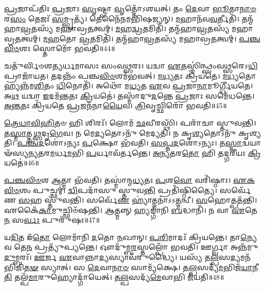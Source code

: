 \-\ul{𑌪𑍍𑌰}\-𑌜𑌾\-𑌪᳴𑌤𑌿𑌃 \ul{𑌪𑍍𑌰}\-𑌜𑌾𑌃 \ul{𑌸𑍃}\-𑌷𑍍𑌟𑍍𑌵𑌾 \ul{𑌵𑍃}\-𑌤𑍍𑌤𑍋᳴\-𑌽𑌶𑌯𑌤𑍍।
𑌤𑌂 \ul{𑌦𑍇}\-𑌵𑌾 \ul{𑌭𑍂}\-𑌤𑌾\-\ul{𑌨𑌾}\-\-\ul{𑍞} 𑌰\-\ul{𑌸𑌂} 𑌤𑍇𑌜𑌃᳴ \ul{𑌸}\-𑌮𑍍𑌭𑍃𑌤𑍍𑌯᳴।
𑌤𑍇𑌨𑍈᳴𑌨𑌮𑌭𑌿𑌷𑌜𑍍𑌯𑌨𑍍।
\-\ul{𑌮}\-𑌹𑌾𑌨᳴𑌵\-\ul{𑌵}\-𑌰𑍍𑌤𑍀𑌤𑌿᳴।
𑌤𑌨𑍍𑌮᳴𑌹𑌾\-\ul{𑌵𑍍𑌰}\-𑌤𑌸𑍍𑌯᳴ 𑌮𑌹𑌾𑌵𑍍𑌰\-\ul{𑌤}\-𑌤𑍍𑌵𑌮𑍍।
\-\ul{𑌮}\-𑌹\-\ul{𑌦𑍍𑌵𑍍𑌰}\-𑌤𑌮𑌿𑌤𑌿᳴।
𑌤𑌨𑍍𑌮᳴𑌹𑌾\-\ul{𑌵𑍍𑌰}\-𑌤𑌸𑍍𑌯᳴ 𑌮𑌹𑌾𑌵𑍍𑌰\-\ul{𑌤}\-𑌤𑍍𑌵𑌮𑍍।
\-\ul{𑌮}\-\-\ul{𑌹}\-𑌤𑍋 \ul{𑌵𑍍𑌰}\-𑌤𑌮𑌿𑌤𑌿᳴।
𑌤𑌨𑍍𑌮᳴𑌹𑌾\-\ul{𑌵𑍍𑌰}\-𑌤𑌸𑍍𑌯᳴ 𑌮𑌹𑌾𑌵𑍍𑌰\-\ul{𑌤}\-𑌤𑍍𑌵𑌮𑍍।
\-\ul{𑌪}\-\-\ul{𑌞𑍍𑌚}\-\-\ul{𑌵𑌿}\-\-\ul{𑍞}\-𑌶𑌃 𑌸𑍍𑌤𑍋𑌮𑍋᳴ 𑌭𑌵𑌤𑌿॥44॥

𑌚𑌤𑍁᳴𑌰𑍍𑌵𑌿𑍞𑌶𑌤𑍍𑌯𑌰𑍍𑌧𑌮𑌾𑌸𑌃 𑌸𑌂𑌵\-\ul{𑌥𑍍𑌸}\-𑌰𑌃।
𑌯𑌦𑍍𑌵𑌾 \ul{𑌏}\-𑌤𑌸𑍍𑌮𑌿॑𑌨𑍍𑌥𑍍𑌸𑌂𑌵\-\ul{𑌥𑍍𑌸}\-𑌰𑍇𑌽\-\ul{𑌧𑌿} 𑌪𑍍𑌰𑌾𑌜𑌾᳴𑌯𑌤।
𑌤𑌦𑌨𑍍𑌨𑌂᳴ 𑌪𑌞𑍍𑌚\-\ul{𑌵𑌿}\-\-\ul{𑍞}\-𑌶𑌮᳴𑌭𑌵𑌤𑍍।
\-\ul{𑌮}\-\-\ul{𑌧𑍍𑌯}\-𑌤𑌃 𑌕𑍍𑌰𑌿᳴𑌯𑌤𑍇।
\-\ul{𑌮}\-\-\ul{𑌧𑍍𑌯}\-𑌤𑍋 𑌹𑍍𑌯𑌨𑍍𑌨᳴𑌮\-\ul{𑌶𑌿}\-𑌤𑌂 \ul{𑌧𑌿}\-𑌨𑍋𑌤𑌿᳴।
𑌅𑌥𑍋᳴ 𑌮\-\ul{𑌧𑍍𑌯}\-𑌤 \ul{𑌏}\-𑌵 \ul{𑌪𑍍𑌰}\-𑌜𑌾\-\ul{𑌨𑌾}\-𑌮𑍂𑌰𑍍𑌗𑍍𑌧𑍀᳴𑌯𑌤𑍇।
𑌅\-\ul{𑌥} 𑌯𑌦𑍍𑌵𑌾 \ul{𑌇}\-𑌦𑌮᳴\-\ul{𑌨𑍍𑌤}\-𑌤𑌃 \ul{𑌕𑍍𑌰𑌿}\-𑌯𑌤𑍇॑।
𑌤𑌸𑍍𑌮𑌾᳴𑌦𑍁\-\ul{𑌦}\-𑌨𑍍𑌤𑍇 \ul{𑌪𑍍𑌰}\-𑌜𑌾𑌃 𑌸𑌮𑍇᳴𑌧𑌨𑍍𑌤𑍇।
\-\ul{𑌅}\-\-\ul{𑌨𑍍𑌤}\-𑌤𑌃 𑌕𑍍𑌰𑌿᳴𑌯𑌤𑍇 \ul{𑌪𑍍𑌰}\-𑌜𑌨᳴𑌨𑌾\-\ul{𑌯𑍈}\-𑌵।
\-\ul{𑌤𑍍𑌰𑌿}\-𑌵𑍃𑌚𑍍𑌛𑌿𑌰𑍋᳴ 𑌭𑌵𑌤𑌿॥45॥

\-\ul{𑌤𑍍𑌰𑍇}\-\-\ul{𑌧𑌾}\-\-\ul{𑌵𑌿}\-\-\ul{𑌹𑌿}\-𑌤𑍞 𑌹𑌿 𑌶𑌿𑌰𑌃᳴।
𑌲𑍋𑌮᳴ \ul{𑌛}\-𑌵𑍀𑌰𑌸𑍍𑌥𑌿᳴।
𑌪𑌰𑌾᳴𑌚𑌾 𑌸𑍍𑌤𑍁𑌵𑌨𑍍𑌤𑌿।
𑌤\-\ul{𑌸𑍍𑌮𑌾}\-𑌤𑍍𑌤\-\ul{𑌥𑍍𑌸}\-𑌦𑍃\-\ul{𑌗𑍇}\-𑌵।
𑌨 𑌮𑍇\-\ul{𑌦𑍍𑌯}\-𑌤𑍋𑌽𑌨𑍁᳴ 𑌮𑍇𑌦𑍍𑌯𑌤𑌿।
𑌨 𑌕𑍃\-\ul{𑌶𑍍𑌯}\-𑌤𑍋𑌽𑌨𑍁᳴ 𑌕𑍃𑌶𑍍𑌯𑌤𑌿।
\-\ul{𑌪}\-\-\ul{𑌞𑍍𑌚}\-\-\ul{𑌦}\-𑌶𑍋॑\-𑌽𑌨𑍍𑌯𑌃 \ul{𑌪}\-𑌕𑍍𑌷𑍋 𑌭᳴𑌵𑌤𑌿।
\-\ul{𑌸}\-\-\ul{𑌪𑍍𑌤}\-\-\ul{𑌦}\-𑌶𑍋॑\-𑌽𑌨𑍍𑌯𑌃।
𑌤\-\ul{𑌸𑍍𑌮𑌾}\-𑌦𑍍𑌵𑌯𑌾𑍟᳴𑌸𑍍𑌯𑌨𑍍𑌯\-\ul{𑌤}\-𑌰\-\ul{𑌮}\-𑌰𑍍𑌧\-\ul{𑌮}\-𑌭𑌿 \ul{𑌪}\-𑌰𑍍𑌯𑌾𑌵᳴𑌰𑍍𑌤𑌨𑍍𑌤𑍇।
\-\ul{𑌅}\-\-\ul{𑌨𑍍𑌯}\-\-\ul{𑌤}\-𑌰\-\ul{𑌤𑍋} 𑌹𑌿 𑌤𑌦𑍍𑌗𑌰𑍀᳴𑌯𑌃 \ul{𑌕𑍍𑌰𑌿}\-𑌯𑌤𑍇॑॥46॥

\-\ul{𑌪}\-\-\ul{𑌞𑍍𑌚}\-\-\ul{𑌵𑌿}\-\-\ul{𑍞}\-𑌶 \ul{𑌆}\-𑌤𑍍𑌮𑌾 𑌭᳴𑌵𑌤𑌿।
𑌤𑌸𑍍𑌮𑌾॑𑌨𑍍𑌮\-\ul{𑌧𑍍𑌯}\-𑌤𑌃 \ul{𑌪}\-𑌶\-\ul{𑌵𑍋} 𑌵𑌰𑌿᳴𑌷𑍍𑌠𑌾𑌃।
\-\ul{𑌏}\-\-\ul{𑌕}\-\-\ul{𑌵𑌿}\-\-\ul{𑍞}\-𑌶𑌂 𑌪𑍁𑌚𑍍𑌛𑌮𑍍॑।
\-\ul{𑌦𑍍𑌵𑌿}\-𑌪𑌦𑌾᳴𑌸𑍁 𑌸𑍍𑌤𑍁𑌵\-\ul{𑌨𑍍𑌤𑌿} 𑌪𑍍𑌰𑌤𑌿᳴\-𑌷𑍍𑌠𑌿𑌤𑍍𑌯𑍈।
𑌸𑌰𑍍𑌵𑍇᳴𑌣 \ul{𑌸}\-𑌹 𑌸𑍍𑌤𑍁᳴𑌵𑌨𑍍𑌤𑌿।
𑌸𑌰𑍍𑌵𑍇᳴\-\ul{𑌣} 𑌹𑍍𑌯𑌾॑𑌤𑍍𑌮𑌨𑌾॑\-𑌽𑌽\-\ul{𑌤𑍍𑌮}\-𑌨𑍍𑌵𑍀।
\-\ul{𑌸}\-𑌹𑍋𑌤𑍍𑌪𑌤᳴𑌨𑍍𑌤𑌿।
𑌏𑌕𑍈᳴\-\ul{𑌕𑌾}\-𑌮𑍁𑌚𑍍𑌛𑌿𑍞᳴𑌷𑌨𑍍𑌤𑌿।
\-\ul{𑌆}\-𑌤𑍍𑌮𑌨𑍍𑌨𑍍 𑌹𑍍𑌯𑌙𑍍𑌗𑌾᳴𑌨𑌿 \ul{𑌬}\-𑌦𑍍𑌧𑌾𑌨𑌿᳴।
𑌨 𑌵𑌾 \ul{𑌏}\-𑌤𑍇\-\ul{𑌨} 𑌸\-\ul{𑌰𑍍𑌵𑌃} 𑌪𑍁𑌰𑍁᳴𑌷𑌃॥47॥

𑌯\-\ul{𑌦𑌿}\-𑌤 𑌇᳴\-\ul{𑌤𑍋} 𑌲𑍋𑌮𑌾᳴𑌨𑌿 \ul{𑌦}\-𑌤𑍋 \ul{𑌨}\-𑌖𑌾𑌨𑍍।
\-\ul{𑌪}\-\-\ul{𑌰𑌿}\-𑌮𑌾𑌦𑌃᳴ 𑌕𑍍𑌰𑌿𑌯𑌨𑍍𑌤𑍇।
𑌤𑌾\-\ul{𑌨𑍍𑌯𑍇}\-𑌵 𑌤𑍇\-\ul{𑌨} 𑌪𑍍𑌰𑌤𑍍𑌯𑍁᳴𑌪𑍍𑌯𑌨𑍍𑌤𑍇।
𑌔𑌦𑍁᳴𑌮𑍍𑌬\-\ul{𑌰}\-𑌸𑍍𑌤𑌲𑍍𑌪𑍋᳴ 𑌭𑌵𑌤𑌿।
𑌊𑌰𑍍𑌗𑍍𑌵𑌾 𑌅𑌨𑍍𑌨᳴𑌮𑍁\-\ul{𑌦𑍁}\-𑌮𑍍𑌬𑌰𑌃᳴।
\-\ul{𑌊}\-𑌰𑍍𑌜 \ul{𑌏}\-𑌵𑌾𑌨𑍍𑌨𑌾\-\ul{𑌦𑍍𑌯}\-𑌸𑍍𑌯𑌾𑌵᳴𑌰𑍁𑌦𑍍𑌧𑍍𑌯𑍈।
𑌯𑌸𑍍𑌯᳴ 𑌤\-\ul{𑌲𑍍𑌪}\-𑌸\-\ul{𑌦𑍍𑌯}\-𑌮𑌨᳴𑌭𑌿𑌜𑌿\-\ul{𑌤}\-\-\ul{𑍟} 𑌸𑍍𑌯𑌾𑌤𑍍।
𑌸 \ul{𑌦𑍇}\-𑌵𑌾\-\ul{𑌨𑌾}\-\-\ul{𑍞} 𑌸𑌾𑌮𑍍𑌯᳴𑌕𑍍𑌷𑍇।
\-\ul{𑌤}\-\-\ul{𑌲𑍍𑌪}\-𑌸𑌦𑍍𑌯᳴\-\ul{𑌮}\-𑌭𑌿𑌜᳴\-\ul{𑌯𑌾}\-𑌨𑍀\-\ul{𑌤𑌿} 𑌤𑌲𑍍𑌪᳴\-\ul{𑌮𑌾}\-𑌰𑍁𑌹𑍍𑌯𑍋𑌦𑍍𑌗𑌾᳴𑌯𑍇𑌤𑍍।
\-\ul{𑌤}\-\-\ul{𑌲𑍍𑌪}\-𑌸𑌦𑍍𑌯᳴\-\ul{𑌮𑍇}\-𑌵𑌾𑌭𑌿 𑌜᳴𑌯𑌤𑌿॥48॥

